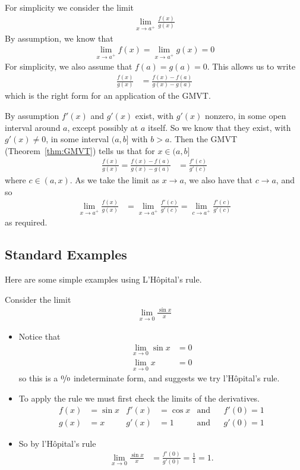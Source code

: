 For simplicity we consider the limit
\begin{align*}
  \lim_{x\to a^+} \frac{f(x)}{g(x)}
\end{align*}
By assumption, we know that
\begin{align*}
  \lim_{x\to a^+} f(x) = \lim_{x\to a^+} g(x) = 0
\end{align*}
For simplicity, we also assume that $f(a)=g(a)=0$. This
allows us to write
\begin{align*}
  \frac{f(x)}{g(x)} &= \frac{f(x)-f(a)}{g(x)-g(a)}
\end{align*}
which is the right form for an application of the GMVT.

By assumption $f'(x)$ and $g'(x)$ exist, with $g'(x)$ nonzero, in some open interval around
$a$, except possibly at $a$ itself. So we know that they exist, with $g'(x)\ne 0$, in some
interval $(a,b]$ with $b>a$.  Then the GMVT
(Theorem~\ref{thm:GMVT}) tells us that for $x\in (a,b]$
\begin{align*}
  \frac{f(x)}{g(x)} = \frac{f(x)-f(a)}{g(x)-g(a)} &= \frac{f'(c)}{g'(c)}
\end{align*}
where $c \in (a,x)$. As we take the limit as $x\to a$, we also have that $c\to a$, and so
\begin{align*}
  \lim_{x\to a^+}\frac{f(x)}{g(x)}
  &= \lim_{x\to a^+} \frac{f'(c)}{g'(c)}
  = \lim_{c \to a^+} \frac{f'(c)}{g'(c)}
\end{align*}
as required.

\subsection{Standard Examples}
Here are some simple examples using L'H\^opital's rule.
\begin{eg}\label{eg:hopitalA}
Consider the limit
\begin{align*}
  \lim_{x\to 0} \frac{\sin x}{x}
\end{align*}
\begin{itemize}
 \item Notice that
\begin{align*}
  \lim_{x\to 0} \sin x &= 0 \\
  \lim_{x\to 0} x &= 0
\end{align*}
so this is a $\nicefrac00$ indeterminate form, and suggests we try l'H\^opital's rule.
\item To apply the rule we must first check the limits of the derivatives.
\begin{align*}
  f(x)&= \sin x & f'(x) & =\cos x & \text{and} &&
  f'(0)=1\\
  g(x) &= x & g'(x) & = 1 & \text{and} &&
  g'(0)=1
\end{align*}
\item So by l'H\^opital's rule
\begin{align*}
  \lim_{x\to 0} \frac{\sin x}{x} &= \frac{f'(0)}{g'(0)} = \frac{1}{1} = 1.
\end{align*}
\end{itemize}
\end{eg}



